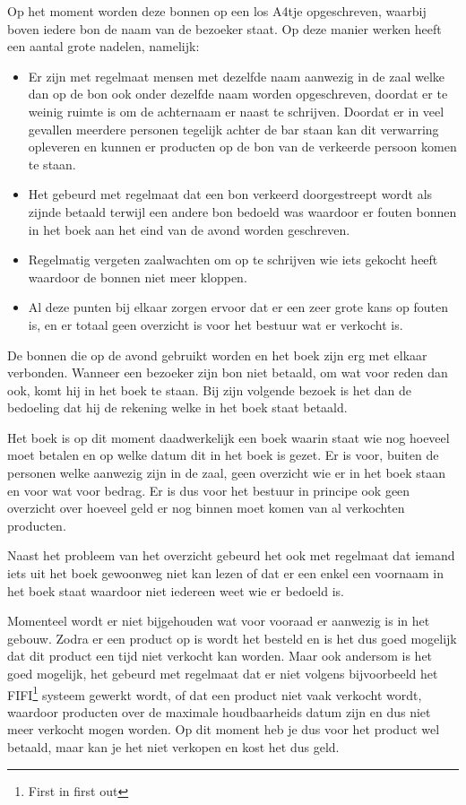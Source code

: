 Op het moment worden deze bonnen op een los A4tje opgeschreven, waarbij boven iedere bon de naam van de bezoeker staat. Op deze manier werken heeft een aantal grote nadelen, namelijk:
\begin{itemize}
        \item Er zijn met regelmaat mensen met dezelfde naam aanwezig in de zaal welke dan op de bon ook onder dezelfde naam worden opgeschreven, doordat er te weinig ruimte is om de achternaam er naast te schrijven. Doordat er in veel gevallen meerdere personen tegelijk achter de bar staan kan dit verwarring opleveren en kunnen er producten op de bon van de verkeerde persoon komen te staan. 
        \item Het gebeurd met regelmaat dat een bon verkeerd doorgestreept wordt als zijnde betaald terwijl een andere bon bedoeld was waardoor er fouten bonnen in het boek aan het eind van de avond worden geschreven.
        \item Regelmatig vergeten zaalwachten om op te schrijven wie iets gekocht heeft waardoor de bonnen niet meer kloppen.
        \item Al deze punten bij elkaar zorgen ervoor dat er een zeer grote kans op fouten is, en er totaal geen overzicht is voor het bestuur wat er verkocht is.
\end{itemize}

De bonnen die op de avond gebruikt worden en het boek zijn erg met elkaar verbonden. Wanneer een bezoeker zijn bon niet betaald, om wat voor reden dan ook, komt hij in het boek te staan. Bij zijn volgende bezoek is het dan de bedoeling dat hij de rekening welke in het boek staat betaald.

Het boek is op dit moment daadwerkelijk een boek waarin staat wie nog hoeveel moet betalen en op welke datum dit in het boek is gezet. Er is voor, buiten de personen welke aanwezig zijn in de zaal, geen overzicht wie er in het boek staan en voor wat voor bedrag. Er is dus voor het bestuur in principe ook geen overzicht over hoeveel geld er nog binnen moet komen van al verkochten producten.

Naast het probleem van het overzicht gebeurd het ook met regelmaat dat iemand iets uit het boek gewoonweg niet kan lezen of dat er een enkel een voornaam in het boek staat waardoor niet iedereen weet wie er bedoeld is. 

Momenteel wordt er niet bijgehouden wat voor vooraad er aanwezig is in het gebouw. Zodra er een product op is wordt het besteld en is het dus goed mogelijk dat dit product een tijd niet verkocht kan worden. Maar ook andersom is het goed mogelijk, het gebeurd met regelmaat dat er niet volgens bijvoorbeeld het FIFI\footnote{First in first out} systeem gewerkt wordt, of dat een product niet vaak verkocht wordt, waardoor producten over de maximale houdbaarheids datum zijn en dus niet meer verkocht mogen worden. Op dit moment heb je dus voor het product wel betaald, maar kan je het niet verkopen en kost het dus geld.

